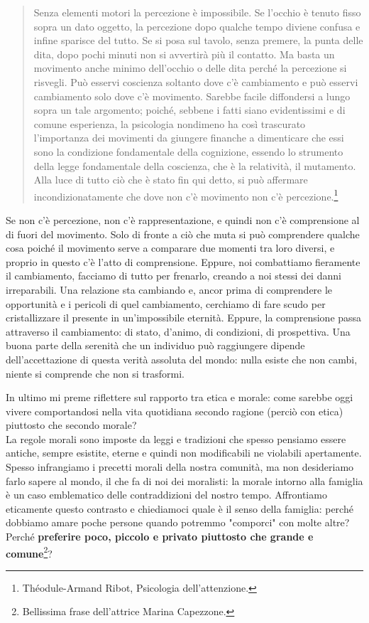 \begin{quotation}
	\small Senza elementi motori la percezione è impossibile. Se l’occhio è tenuto fisso sopra un dato oggetto, la percezione dopo qualche tempo diviene confusa e infine sparisce del tutto. Se si posa sul tavolo, senza premere, la punta delle dita, dopo pochi minuti non si avvertirà più il contatto. Ma basta un movimento anche minimo dell’occhio o delle dita perché la percezione si risvegli. Può esservi coscienza soltanto dove c’è cambiamento e può esservi cambiamento solo dove c’è movimento. Sarebbe facile diffondersi a lungo sopra un tale argomento; poiché, sebbene i fatti siano evidentissimi e di comune esperienza, la psicologia nondimeno ha così trascurato l’importanza dei movimenti da giungere finanche a dimenticare che essi sono la condizione fondamentale della cognizione, essendo lo strumento della legge fondamentale della coscienza, che è la relatività, il mutamento. Alla luce di tutto ciò che è stato fin qui detto, si può affermare incondizionatamente che dove non c’è movimento non c’è percezione.\footnote{Théodule-Armand Ribot, Psicologia dell'attenzione.}
\end{quotation}

Se  non c'è percezione, non c'è rappresentazione, e quindi non c'è comprensione al di fuori del movimento. Solo di fronte a ciò che muta si può comprendere qualche cosa poiché il movimento serve a comparare due momenti tra loro diversi, e proprio in questo c'è l'atto di comprensione. Eppure, noi combattiamo fieramente il cambiamento, facciamo di tutto per frenarlo, creando a noi stessi dei danni irreparabili. Una relazione sta cambiando e, ancor prima di comprendere le opportunità e i pericoli di quel cambiamento, cerchiamo di fare scudo per cristallizzare il presente in un'impossibile eternità. Eppure, la comprensione passa attraverso il cambiamento: di stato, d'animo, di condizioni, di prospettiva. Una buona parte della serenità che un individuo può raggiungere dipende dell'accettazione di questa verità assoluta del mondo: nulla esiste che non cambi, niente si comprende che non si trasformi.

In ultimo mi preme riflettere sul rapporto tra etica e morale: come sarebbe oggi vivere comportandosi nella vita quotidiana secondo ragione (perciò con etica) piuttosto che secondo morale?\\
La regole morali sono imposte da leggi e tradizioni che spesso pensiamo essere antiche, sempre esistite, eterne e quindi non modificabili ne violabili apertamente. Spesso infrangiamo i precetti morali della nostra comunità, ma non desideriamo farlo sapere al mondo, il che fa di noi dei moralisti: la morale intorno alla famiglia è un caso emblematico delle contraddizioni del nostro tempo.
Affrontiamo eticamente questo contrasto e chiediamoci quale è il senso della famiglia: perché dobbiamo amare poche persone quando  potremmo "comporci" con molte altre? Perché \textbf{preferire poco, piccolo e privato piuttosto che grande e comune}\footnote{Bellissima frase dell'attrice Marina Capezzone.}?

